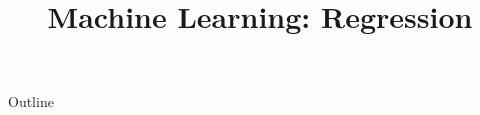\documentclass[xcolor=dvipsnames,compress,t,pdf,9pt]{beamer}
\title[\insertframenumber /\inserttotalframenumber]{Machine Learning: Regression}
\begin{document}
	\begin{frame}
	\titlepage
	\end{frame}

	\begin{frame}{Outline}
	    \tableofcontents
	\end{frame}

	
	
	
\end{document}
